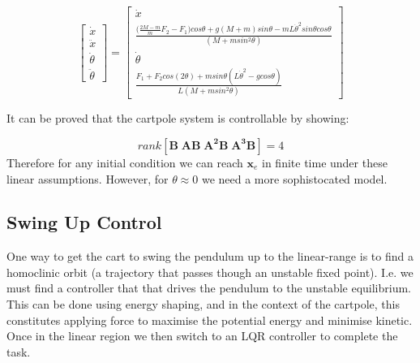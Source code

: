 \documentclass[main.tex]{subfiles}
\begin{document}
\begin{equation}
\begin{bmatrix} \dot{x} \\ \ddot{x} \\ \dot{\theta} \\ \ddot{\theta} \end{bmatrix}  =
\begin{bmatrix} \dot{x} \\ \frac{\big(\frac{2M-m}{m}F_2-F_1\big)cos\theta + g(M+m)sin\theta - mL\dot{\theta}^2 sin\theta cos\theta}{(M + msin^2\theta)} \\ \dot{\theta} \\ \frac{F_1 + F_2cos(2\theta)+ msin\theta(L\dot{\theta}^2-gcos\theta)}{L(M+msin^2\theta)} \end{bmatrix} 
\end{equation}


It can be proved that the cartpole system is controllable by showing:

\begin{equation}
    rank[\boldsymbol{B} \; \boldsymbol{AB} \; \boldsymbol{A^2B} \; \boldsymbol{A^3B}] = 4
\end{equation}
Therefore for any initial condition we can reach $\boldsymbol{x}_e$ in finite time under these linear assumptions.
However, for $\theta \approx 0$ we need a more sophistocated model.

\subsection{Swing Up Control}

One way to get the cart to swing the pendulum up to the linear-range is to find a homoclinic orbit (a trajectory that passes though an unstable fixed point). I.e. we must find a controller that that drives the pendulum to the unstable equilibrium. This can be done using energy shaping, and in the context of the cartpole, this constitutes applying force to maximise the potential energy and minimise kinetic. Once in the linear region we then switch to an LQR controller to complete the task.
\end{document}
